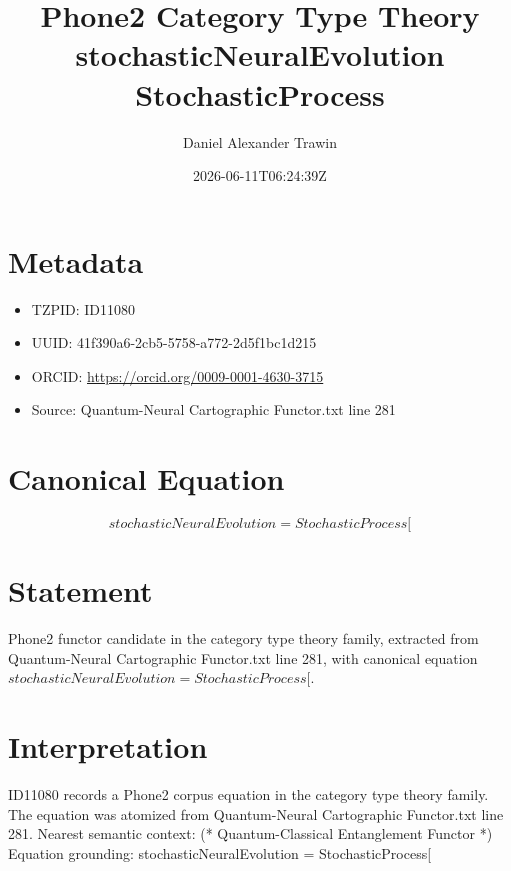 \documentclass[11pt]{article}
\title{Phone2 Category Type Theory stochasticNeuralEvolution StochasticProcess}
\author{Daniel Alexander Trawin}
\date{2026-06-11T06:24:39Z}
\begin{document}
\maketitle
\section*{Metadata}
\begin{itemize}
\item TZPID: ID11080
\item UUID: 41f390a6-2cb5-5758-a772-2d5f1bc1d215
\item ORCID: \url{https://orcid.org/0009-0001-4630-3715}
\item Source: Quantum-Neural Cartographic Functor.txt line 281
\end{itemize}
\section*{Canonical Equation}
\[
stochasticNeuralEvolution = StochasticProcess[
\]
\section*{Statement}
Phone2 functor candidate in the category type theory family, extracted from Quantum-Neural Cartographic Functor.txt line 281, with canonical equation $stochasticNeuralEvolution = StochasticProcess[$.
\section*{Interpretation}
ID11080 records a Phone2 corpus equation in the category type theory family. The equation was atomized from Quantum-Neural Cartographic Functor.txt line 281. Nearest semantic context: (* Quantum-Classical Entanglement Functor *) Equation grounding: stochasticNeuralEvolution = StochasticProcess[
\end{document}
